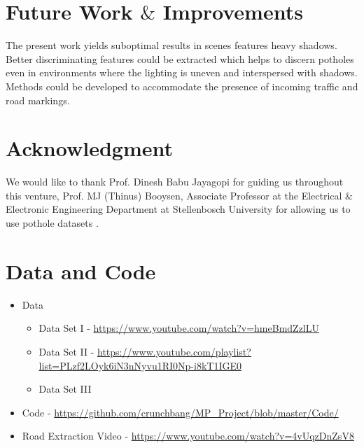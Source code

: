 \documentclass[journal]{IEEEtran}
\begin{document}
\section{Future Work $\&$ Improvements}
The present work yields sub\-optimal results in scenes features heavy shadows. Better discriminating features could be extracted which helps to discern potholes even in environments where the lighting is uneven and interspersed with shadows. Methods could be developed to accommodate the presence of incoming traffic and road markings.


\section*{Acknowledgment}
We would like to thank Prof. Dinesh Babu Jayagopi for guiding us throughout this venture, Prof. MJ (Thinus) Booysen, Associate Professor at the Electrical $\&$ Electronic Engineering Department at Stellenbosch University for allowing us to use pothole datasets \cite{dataset}.

\vspace{0.5cm}

\ifCLASSOPTIONcaptionsoff
  \newpage
\fi


\appendices
\section{Data and Code}
\begin{itemize}
\item Data 
\begin{itemize}
\item Data Set I - \url{https://www.youtube.com/watch?v=hmeBmdZzlLU}
\item Data Set II - \url{https://www.youtube.com/playlist?list=PLzf2LOyk6iN3nNyvu1RI0Np-i8kT1IGE0}
\item Data Set III \cite{dataset}
\end{itemize}

\item Code - \url{https://github.com/crunchbang/MP_Project/blob/master/Code/}
\item Road Extraction Video - \url{https://www.youtube.com/watch?v=4vUqzDnZsV8}
\end{itemize}

\end{document}
